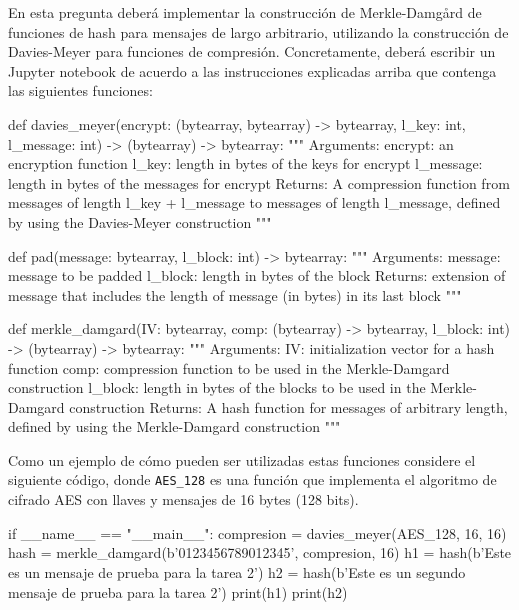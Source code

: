 
En esta pregunta deberá implementar la construcción de Merkle-Damgård
de funciones de hash para mensajes de largo arbitrario, utilizando la
construcción de Davies-Meyer para funciones de
compresión. Concretamente, deberá escribir un Jupyter notebook de
acuerdo a las instrucciones explicadas arriba que contenga las
siguientes funciones:
\begin{python}
def davies_meyer(encrypt: (bytearray, bytearray) -> bytearray,
                 l_key: int, l_message: int) -> (bytearray) -> bytearray:
    """
    Arguments:
      encrypt: an encryption function
      l_key: length in bytes of the keys for encrypt
      l_message: length in bytes of the messages for encrypt
    Returns:
      A compression function from messages of length l_key + l_message to
      messages of length l_message, defined by using the Davies-Meyer
      construction   
    """
\end{python}

\begin{python}
def pad(message: bytearray, l_block: int) -> bytearray:
    """
    Arguments:
      message: message to be padded
      l_block: length in bytes of the block
    Returns:
      extension of message that includes the length of message
      (in bytes) in its last block
    """
\end{python}

\begin{python}
def merkle_damgard(IV: bytearray, comp: (bytearray) -> bytearray,
                   l_block: int) -> (bytearray) -> bytearray:
    """
    Arguments:
      IV: initialization vector for a hash function
      comp: compression function to be used in the Merkle-Damgard
      construction
      l_block: length in bytes of the blocks to be used in the Merkle-Damgard
      construction
    Returns:
      A hash function for messages of arbitrary length, defined by using
      the Merkle-Damgard construction
    """
\end{python}    
Como un ejemplo de cómo pueden ser utilizadas estas funciones
considere el siguiente código, donde \verb+AES_128+ es una función que
implementa el algoritmo de cifrado AES con llaves y mensajes de 16
bytes (128 bits).
\begin{python}
if __name__ == "__main__":
    compresion = davies_meyer(AES_128, 16, 16)
    hash = merkle_damgard(b'0123456789012345', compresion, 16)
    h1 = hash(b'Este es un mensaje de prueba para la tarea 2')
    h2 = hash(b'Este es un segundo mensaje de prueba para la tarea 2')
    print(h1)
    print(h2)
\end{python}    

